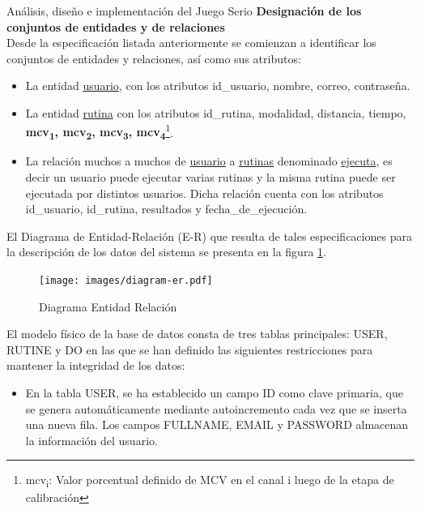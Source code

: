 \begin{thesischapter}{2} {Análisis, diseño e implementación del Juego Serio}
    \vspace{10pt}
    \textbf{Designación de los conjuntos de entidades y de relaciones}\\
    Desde la especificación listada anteriormente se comienzan a
    identificar los conjuntos de entidades y relaciones, así como sus atributos:
    \begin{itemize}
        \item La entidad \underline{usuario}, con los atributos id\_usuario, nombre, correo, contraseña.
        \item La entidad \underline{rutina} con los atributos id\_rutina, modalidad, distancia, tiempo, \textbf{mcv\textsubscript{1}, mcv\textsubscript{2}, mcv\textsubscript{3}, mcv\textsubscript{4}}\footnote{mcv\textsubscript{i}: Valor porcentual definido de MCV en el canal i luego de la etapa de calibración}.
        \item La relación muchos a muchos de \underline{usuario} a \underline{rutinas} denominado \underline{ejecuta}, es decir un usuario puede ejecutar 
        varias rutinas y la misma rutina puede ser ejecutada por distintos usuarios. Dicha relación cuenta con los atributos id\_usuario, id\_rutina, resultados y fecha\_de\_ejecución. 
    \end{itemize}
    
    \vspace{10pt}
    El Diagrama de Entidad-Relación (E-R) que resulta de tales especificaciones para la descripción de los datos del sistema se presenta en la figura \ref{fig: diagram-er}.
    \begin{figure}[ht]
        \centering
        \texttt{[image: images/diagram-er.pdf]}
        \caption{Diagrama Entidad Relación}
        \label{fig: diagram-er}
    \end{figure}

    El modelo físico de la base de datos consta de tres tablas principales: USER, RUTINE y DO en las que se han definido las siguientes 
    restricciones para mantener la integridad de los datos:

    \vspace{10pt}
    \begin{itemize}
        \item En la tabla USER, se ha establecido un campo ID como clave primaria, que se genera automáticamente mediante autoincremento 
        cada vez que se inserta una nueva fila. Los campos FULLNAME, EMAIL y PASSWORD almacenan la información del usuario.
    

\end{itemize}
\end{thesischapter}
